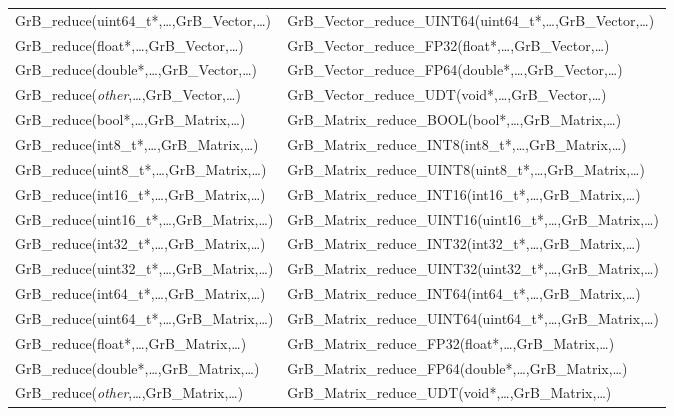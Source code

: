 \begin{table}[htb]
{\begin{tabular}{l|l}
{\sf GrB\_reduce(uint64\_t*,\ldots,GrB\_Vector,\ldots)}		& {\sf GrB\_Vector\_reduce\_UINT64(uint64\_t*,\ldots,GrB\_Vector,\ldots)} \\
{\sf GrB\_reduce(float*,\ldots,GrB\_Vector,\ldots)}		& {\sf GrB\_Vector\_reduce\_FP32(float*,\ldots,GrB\_Vector,\ldots)} \\
{\sf GrB\_reduce(double*,\ldots,GrB\_Vector,\ldots)}		& {\sf GrB\_Vector\_reduce\_FP64(double*,\ldots,GrB\_Vector,\ldots)} \\
{\sf GrB\_reduce(\emph{other},\ldots,GrB\_Vector,\ldots)}	& {\sf GrB\_Vector\_reduce\_UDT(void*,\ldots,GrB\_Vector,\ldots)} \\ \hline
{\sf GrB\_reduce(bool*,\ldots,GrB\_Matrix,\ldots)}		& {\sf GrB\_Matrix\_reduce\_BOOL(bool*,\ldots,GrB\_Matrix,\ldots)} \\
{\sf GrB\_reduce(int8\_t*,\ldots,GrB\_Matrix,\ldots)}		& {\sf GrB\_Matrix\_reduce\_INT8(int8\_t*,\ldots,GrB\_Matrix,\ldots)} \\
{\sf GrB\_reduce(uint8\_t*,\ldots,GrB\_Matrix,\ldots)}		& {\sf GrB\_Matrix\_reduce\_UINT8(uint8\_t*,\ldots,GrB\_Matrix,\ldots)} \\
{\sf GrB\_reduce(int16\_t*,\ldots,GrB\_Matrix,\ldots)}		& {\sf GrB\_Matrix\_reduce\_INT16(int16\_t*,\ldots,GrB\_Matrix,\ldots)} \\
{\sf GrB\_reduce(uint16\_t*,\ldots,GrB\_Matrix,\ldots)}		& {\sf GrB\_Matrix\_reduce\_UINT16(uint16\_t*,\ldots,GrB\_Matrix,\ldots)} \\
{\sf GrB\_reduce(int32\_t*,\ldots,GrB\_Matrix,\ldots)}		& {\sf GrB\_Matrix\_reduce\_INT32(int32\_t*,\ldots,GrB\_Matrix,\ldots)} \\
{\sf GrB\_reduce(uint32\_t*,\ldots,GrB\_Matrix,\ldots)}		& {\sf GrB\_Matrix\_reduce\_UINT32(uint32\_t*,\ldots,GrB\_Matrix,\ldots)} \\
{\sf GrB\_reduce(int64\_t*,\ldots,GrB\_Matrix,\ldots)}		& {\sf GrB\_Matrix\_reduce\_INT64(int64\_t*,\ldots,GrB\_Matrix,\ldots)} \\
{\sf GrB\_reduce(uint64\_t*,\ldots,GrB\_Matrix,\ldots)}		& {\sf GrB\_Matrix\_reduce\_UINT64(uint64\_t*,\ldots,GrB\_Matrix,\ldots)} \\
{\sf GrB\_reduce(float*,\ldots,GrB\_Matrix,\ldots)}		& {\sf GrB\_Matrix\_reduce\_FP32(float*,\ldots,GrB\_Matrix,\ldots)} \\
{\sf GrB\_reduce(double*,\ldots,GrB\_Matrix,\ldots)}		& {\sf GrB\_Matrix\_reduce\_FP64(double*,\ldots,GrB\_Matrix,\ldots)} \\
{\sf GrB\_reduce(\emph{other},\ldots,GrB\_Matrix,\ldots)}	& {\sf GrB\_Matrix\_reduce\_UDT(void*,\ldots,GrB\_Matrix,\ldots)} \\ \hline
\end{tabular}
}
\label{Tab:NonPolymorphic6}
\end{table}
